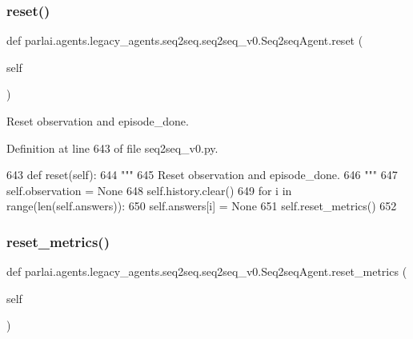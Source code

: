 \subsubsection{\texorpdfstring{reset()}{reset()}}
{\footnotesize\ttfamily def parlai.\+agents.\+legacy\+\_\+agents.\+seq2seq.\+seq2seq\+\_\+v0.\+Seq2seq\+Agent.\+reset (\begin{DoxyParamCaption}\item[{}]{self }\end{DoxyParamCaption})}

\begin{DoxyVerb}Reset observation and episode_done.
\end{DoxyVerb}
 

Definition at line 643 of file seq2seq\+\_\+v0.\+py.


\begin{DoxyCode}
643     \textcolor{keyword}{def }reset(self):
644         \textcolor{stringliteral}{"""}
645 \textcolor{stringliteral}{        Reset observation and episode\_done.}
646 \textcolor{stringliteral}{        """}
647         self.observation = \textcolor{keywordtype}{None}
648         self.history.clear()
649         \textcolor{keywordflow}{for} i \textcolor{keywordflow}{in} range(len(self.answers)):
650             self.answers[i] = \textcolor{keywordtype}{None}
651         self.reset\_metrics()
652 
\end{DoxyCode}
\mbox{\label{classparlai_1_1agents_1_1legacy__agents_1_1seq2seq_1_1seq2seq__v0_1_1Seq2seqAgent_ae76435bf7acee9501188de47c0ba6991}} 
\subsubsection{\texorpdfstring{reset\+\_\+metrics()}{reset\_metrics()}}
{\footnotesize\ttfamily def parlai.\+agents.\+legacy\+\_\+agents.\+seq2seq.\+seq2seq\+\_\+v0.\+Seq2seq\+Agent.\+reset\+\_\+metrics (\begin{DoxyParamCaption}\item[{}]{self }\end{DoxyParamCaption})}

